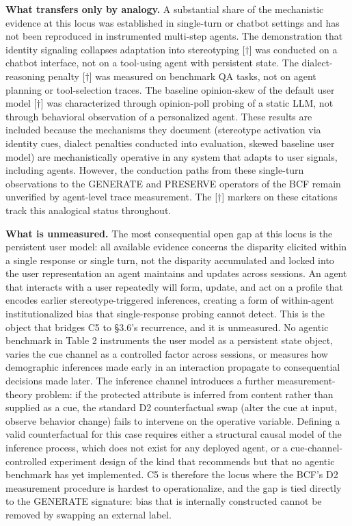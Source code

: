 \documentclass[10pt]{article}
\begin{document}
\textbf{What transfers only by analogy.} A substantial share of the mechanistic evidence at this locus was established in single-turn or chatbot settings and has not been reproduced in instrumented multi-step agents. The demonstration that identity signaling collapses adaptation into stereotyping \cite{kantharuban2024stereotype}[$\dagger$] was conducted on a chatbot interface, not on a tool-using agent with persistent state. The dialect-reasoning penalty \cite{lin2024assessing}[$\dagger$] was measured on benchmark QA tasks, not on agent planning or tool-selection traces. The baseline opinion-skew of the default user model \cite{santurkar2023whose}[$\dagger$] was characterized through opinion-poll probing of a static LLM, not through behavioral observation of a personalized agent. These results are included because the mechanisms they document (stereotype activation via identity cues, dialect penalties conducted into evaluation, skewed baseline user model) are mechanistically operative in any system that adapts to user signals, including agents. However, the conduction paths from these single-turn observations to the GENERATE and PRESERVE operators of the BCF remain unverified by agent-level trace measurement. The [$\dagger$] markers on these citations track this analogical status throughout.

\textbf{What is unmeasured.} The most consequential open gap at this locus is the persistent user model: all available evidence concerns the disparity elicited within a single response or single turn, not the disparity accumulated and locked into the user representation an agent maintains and updates across sessions. An agent that interacts with a user repeatedly will form, update, and act on a profile that encodes earlier stereotype-triggered inferences, creating a form of within-agent institutionalized bias that single-response probing cannot detect. This is the object that bridges C5 to \S{}3.6's recurrence, and it is unmeasured. No agentic benchmark in Table 2 instruments the user model as a persistent state object, varies the cue channel as a controlled factor across sessions, or measures how demographic inferences made early in an interaction propagate to consequential decisions made later. The inference channel \cite{staab2023memorization} introduces a further measurement-theory problem: if the protected attribute is inferred from content rather than supplied as a cue, the standard D2 counterfactual swap (alter the cue at input, observe behavior change) fails to intervene on the operative variable. Defining a valid counterfactual for this case requires either a structural causal model of the inference process, which does not exist for any deployed agent, or a cue-channel-controlled experiment design of the kind that \cite{tonneau2026different} recommends but that no agentic benchmark has yet implemented. C5 is therefore the locus where the BCF's D2 measurement procedure is hardest to operationalize, and the gap is tied directly to the GENERATE signature: bias that is internally constructed cannot be removed by swapping an external label.
\end{document}
